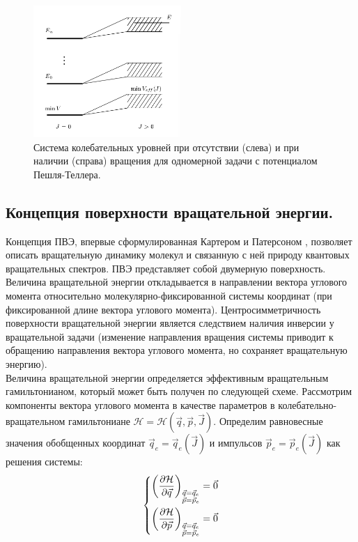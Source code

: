\begin{figure}[H]
  \centering
	\includegraphics[width=0.5\textwidth]{../pictures/VibrationalLevels.png}
	\caption{Система колебательных уровней при отсутствии (слева) и при наличии (справа) вращения для одномерной задачи с потенциалом Пешля-Теллера.}
	\label{fig:vib_levels}
\end{figure}
	
\subsection{Концепция поверхности вращательной энергии.}

Концепция ПВЭ, впервые сформулированная Картером и Патерсоном \cite{petrov2015}, позволяет описать вращательную динамику молекул и связанную с ней природу квантовых вращательных спектров. ПВЭ представляет собой двумерную поверхность. Величина вращательной энергии откладывается в направлении вектора углового момента относительно молекулярно-фиксированной системы координат (при фиксированной длине вектора углового момента). Центросимметричность поверхности вращательной энергии является следствием наличия инверсии у вращательной задачи (изменение направления вращения системы приводит к обращению направления вектора углового момента, но сохраняет вращательную энергию). \\

Величина вращательной энергии определяется эффективным вращательным гамильтонианом, который может быть получен по следующей схеме. Рассмотрим компоненты вектора углового момента в качестве параметров в колебательно-вращательном гамильтониане $\mathcal{H} = \mathcal{H} (\vec{q}, \vec{p}, \vec{J})$. Определим равновесные значения обобщенных координат $\vec{q}_e = \vec{q}_e (\vec{J})$ и импульсов $\vec{p}_e = \vec{p}_e (\vec{J})$ как решения системы:
\begin{gather}
\left\{
\begin{aligned}
\left( \frac{\partial \mathcal{H}}{\partial \vec{q}} \right)_{\substack{\vec{q} = \vec{q}_e \\ \vec{p} = \vec{p}_e}} = \vec{0} \\
\left( \frac{\partial \mathcal{H}}{\partial \vec{p}} \right)_{\substack{\vec{q} = \vec{q}_e \\ \vec{p} = \vec{p}_e}} = \vec{0}
\end{aligned}
\right. \label{eff_ham}
\end{gather}

